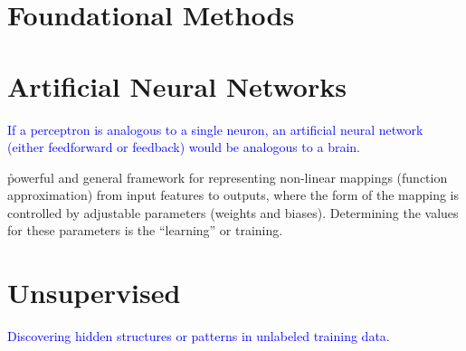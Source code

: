 \chapter{Foundational Methods}















\chapter{Artificial Neural Networks}

\textcolor{blue}{If a perceptron is analogous to a single neuron, an artificial neural network (either feedforward or feedback) would be analogous to a brain.}

\r{powerful and general framework for representing non-linear mappings (function approximation) from input features to outputs, where the form of the mapping is controlled by adjustable parameters (weights and biases). Determining the values for these parameters is the ``learning'' or training.}










\chapter{Unsupervised}

\textcolor{blue}{Discovering hidden structures or patterns in unlabeled training data.}

